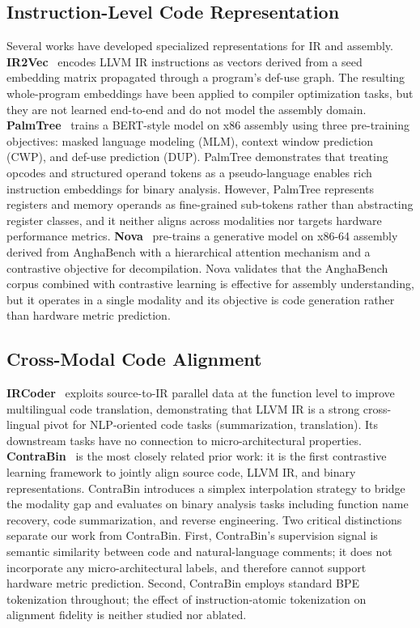 \documentclass[11pt]{article}
\begin{document}
\subsection{Instruction-Level Code Representation}

Several works have developed specialized representations for IR and assembly. \textbf{IR2Vec}~\cite{ir2vec2020} encodes LLVM IR instructions as vectors derived from a seed embedding matrix propagated through a program's def-use graph. The resulting whole-program embeddings have been applied to compiler optimization tasks, but they are not learned end-to-end and do not model the assembly domain. \textbf{PalmTree}~\cite{palmtree2021} trains a BERT-style model on x86 assembly using three pre-training objectives: masked language modeling (MLM), context window prediction (CWP), and def-use prediction (DUP). PalmTree demonstrates that treating opcodes and structured operand tokens as a pseudo-language enables rich instruction embeddings for binary analysis. However, PalmTree represents registers and memory operands as fine-grained sub-tokens rather than abstracting register classes, and it neither aligns across modalities nor targets hardware performance metrics. \textbf{Nova}~\cite{nova2025} pre-trains a generative model on x86-64 assembly derived from AnghaBench with a hierarchical attention mechanism and a contrastive objective for decompilation. Nova validates that the AnghaBench corpus combined with contrastive learning is effective for assembly understanding, but it operates in a single modality and its objective is code generation rather than hardware metric prediction.

\subsection{Cross-Modal Code Alignment}

\textbf{IRCoder}~\cite{ircoder2024} exploits source-to-IR parallel data at the function level to improve multilingual code translation, demonstrating that LLVM IR is a strong cross-lingual pivot for NLP-oriented code tasks (summarization, translation). Its downstream tasks have no connection to micro-architectural properties. \textbf{ContraBin}~\cite{contrabin2025} is the most closely related prior work: it is the first contrastive learning framework to jointly align source code, LLVM IR, and binary representations. ContraBin introduces a simplex interpolation strategy to bridge the modality gap and evaluates on binary analysis tasks including function name recovery, code summarization, and reverse engineering. Two critical distinctions separate our work from ContraBin. First, ContraBin's supervision signal is semantic similarity between code and natural-language comments; it does not incorporate any micro-architectural labels, and therefore cannot support hardware metric prediction. Second, ContraBin employs standard BPE tokenization throughout; the effect of instruction-atomic tokenization on alignment fidelity is neither studied nor ablated.
\end{document}
